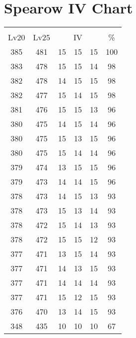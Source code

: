\documentclass{article}%
\begin{document}
%
\normalsize%
\section{Spearow IV Chart}%
\label{sec:Spearow IV Chart}%
\renewcommand{\arraystretch}{1.5}%
\begin{tabular}{|c|c|c|c|c|c|}%
\hline%
\multicolumn{6}{|c|}{\textcolor{white}{ 
\linebreak{Spearow}
}%
\cellcolor{black}}\\%
\multicolumn{1}{|c}{Lv20}&\multicolumn{1}{c|}{Lv25}&\multicolumn{3}{c|}{IV}&\multicolumn{1}{|c|}{\%}\\%
\hline%
\rowcolor{color100}%
385&481&15&15&15&100\\%
\hline%
\rowcolor{color98}%
383&478&15&15&14&98\\%
\hline%
\rowcolor{color98}%
382&478&14&15&15&98\\%
\hline%
\rowcolor{color98}%
382&477&15&14&15&98\\%
\hline%
\rowcolor{color96}%
381&476&15&15&13&96\\%
\hline%
\rowcolor{color96}%
380&475&14&15&14&96\\%
\hline%
\rowcolor{color96}%
380&475&15&13&15&96\\%
\hline%
\rowcolor{color96}%
380&475&15&14&14&96\\%
\hline%
\rowcolor{color96}%
379&474&13&15&15&96\\%
\hline%
\rowcolor{color96}%
379&473&14&14&15&96\\%
\hline%
\rowcolor{color93}%
378&473&14&15&13&93\\%
\hline%
\rowcolor{color93}%
378&473&15&13&14&93\\%
\hline%
\rowcolor{color93}%
378&472&15&14&13&93\\%
\hline%
\rowcolor{color93}%
378&472&15&15&12&93\\%
\hline%
\rowcolor{color93}%
377&471&13&15&14&93\\%
\hline%
\rowcolor{color93}%
377&471&14&13&15&93\\%
\hline%
\rowcolor{color93}%
377&471&14&14&14&93\\%
\hline%
\rowcolor{color93}%
377&471&15&12&15&93\\%
\hline%
\rowcolor{color93}%
376&470&13&14&15&93\\%
\hline%
\rowcolor{color91}%
348&435&10&10&10&67\\%
\end{tabular}

%
\end{document}
